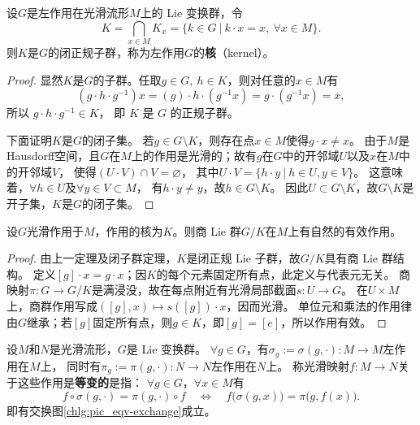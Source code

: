 \begin{theorem}
    设$G$是左作用在光滑流形$M$上的 Lie 变换群，令
    \begin{equation}
        K=\bigcap_{x\in M} K_x=\{k \in G \ |\ k \cdot x=x,\ \forall x \in M\}.
    \end{equation}
    则$K$是$G$的闭正规子群，称为左作用$G$的\textbf{核}（kernel）。
\end{theorem}
\begin{proof}
    显然$K$是$G$的子群。任取$g \in G,\ h \in K$，则对任意的$x \in M$有
    \begin{equation}
        \left(g \cdot h \cdot g^{-1}\right) x  =(g) \cdot h \cdot\left(g^{-1} x\right)
        =g \cdot\left(g^{-1} x\right) =x,
    \end{equation}
    所以 $g \cdot h \cdot g^{-1} \in K$， 即 $K$ 是 $G$ 的正规子群。

    下面证明$K$是$G$的闭子集。 若$g \in G\setminus K$，则存在点$x \in M$使得$g\cdot x \neq x$。
    由于$M$是Hausdorff空间，且$G$在$M$上的作用是光滑的；故有$g$在$G$中的开邻域$U$以及$x$在$M$中的开邻域$V$，
    使得$(U \cdot V) \cap V=\varnothing$，
    其中$U \cdot V=\{h \cdot y \ |\ h \in U, y \in V\}$。
    这意味着，$\forall h \in U$及$\forall y \in V\subset M$，
    有$h \cdot y \neq y$，故$h \in G\setminus K$。
    因此$U \subset G\setminus K$，故$G\setminus K$是开子集，$K$是$G$的闭子集。
\end{proof}

\begin{theorem}
设$G$光滑作用于$M$，作用的核为$K$。则商 Lie 群$G/K$在$M$上有自然的有效作用。
\end{theorem}
\begin{proof}
由上一定理及闭子群定理，$K$是闭正规 Lie 子群，故$G/K$具有商 Lie 群结构。
定义$[g]\cdot x=g\cdot x$；因$K$的每个元素固定所有点，此定义与代表元无关。
商映射$\pi:G\to G/K$是满浸没，故在每点附近有光滑局部截面$s:U\to G$。
在$U\times M$上，商群作用写成$([g],x)\mapsto s([g])\cdot x$，因而光滑。
单位元和乘法的作用律由$G$继承；若$[g]$固定所有点，则$g\in K$，即$[g]=[e]$，所以作用有效。
\end{proof}

\begin{definition}
    设$M$和$N$是光滑流形，$G$是 Lie 变换群。
    $\forall g\in G$，有$\sigma_g := \sigma(g,\cdot): M\to M$左作用在$M$上，
    同时有$\pi_g := \pi(g,\cdot):N\to N$左作用在$N$上。
    称光滑映射$f:M\to N$关于这些作用是\textbf{等变的}是指：
    $\forall g\in G$，$\forall x\in M$有
    \begin{equation}\label{chlg:eqn_equivariant}
        f\circ \sigma(g,\cdot) = \pi(g,\cdot)\circ f
        \quad \Leftrightarrow \quad
        f\bigl( \sigma(g,x) \bigr) = \pi\bigl(g, f(x)\bigr) .
    \end{equation}
    即有交换图\ref{chlg:pic_eqv-exchange}成立。
\end{definition}

